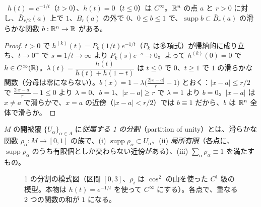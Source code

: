 \begin{lem}[バンプ関数]\label{A:lem:bump}
\tP\ $h(t)=e^{-1/t}$（$t>0$）、$h(t)=0$（$t\le0$）は $C^\infty$。$\mathbb R^n$ の点 $a$ と $r>0$ に対し、$\bar B_{r/2}(a)$ 上で $1$、$B_r(a)$ の外で $0$、$0\le b\le1$ で、$\operatorname{supp}b\subset\bar B_r(a)$ の滑らかな関数 $b:\mathbb R^n\to\mathbb R$ がある。
\end{lem}
\begin{proof}
$t>0$ で $h^{(k)}(t)=P_k(1/t)e^{-1/t}$（$P_k$ は多項式）が帰納的に成り立ち、$t\to0^+$ で $s=1/t\to\infty$ より $P_k(s)e^{-s}\to0$。よって $h^{(k)}(0)=0$ で $h\in C^\infty(\mathbb R)$。$\lambda(t)=\dfrac{h(t)}{h(t)+h(1-t)}$ は $t\le0$ で $0$、$t\ge1$ で $1$ の滑らかな関数（分母は零にならない）。$b(x)=1-\lambda\bigl(\frac{2|x-a|}{r}-1\bigr)$ とおく：$|x-a|\le r/2$ で $\frac{2|x-a|}r-1\le0$ より $\lambda=0$、$b=1$、$|x-a|\ge r$ で $\lambda=1$ より $b=0$。$|x-a|$ は $x\ne a$ で滑らかで、$x=a$ の近傍（$|x-a|<r/2$）では $b\equiv1$ だから、$b$ は $\mathbb R^n$ 全体で滑らか。
\end{proof}

\begin{defn}[1 の分割]
$M$ の開被覆 $\{U_\alpha\}_{\alpha\in A}$ に\emph{従属する 1 の分割}（partition of unity）とは、滑らかな関数 $\rho_\alpha:M\to[0,1]$ の族で、(i) $\operatorname{supp}\rho_\alpha\subset U_\alpha$、(ii) \emph{局所有限}（各点に、$\operatorname{supp}\rho_\alpha$ のうち有限個としか交わらない近傍がある）、(iii) $\sum_\alpha\rho_\alpha\equiv1$ を満たすもの。
\end{defn}

\begin{figure}[htbp]
\centering
{}
\caption{1 の分割の模式図（区間 $[0,3]$、$\rho_i$ は $\cos^2$ の山を使った $C^1$ 級の模型。本物は $h(t)=e^{-1/t}$ を使って $C^\infty$ にする）。各点で、重なる 2 つの関数の和が $1$ になる。}
\end{figure}

